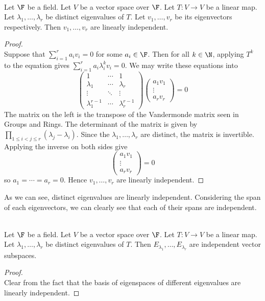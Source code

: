 \documentclass[a4paper]{article}
\begin{document}
\begin{prp}{}{}\\
Let $\F$ be a field. Let $V$ be a vector space over $\F$. Let $T:V\to V$ be a linear map. Let $\lambda_1,\dots,\lambda_r$ be distinct eigenvalues of $T$. Let $v_1,\dots,v_r$ be its eigenvectors respectively. Then $v_1,\dots,v_r$ are linearly independent. 
\begin{proof}\\
Suppose that $\sum_{i=1}^ra_iv_i=0$ for some $a_i\in\F$. Then for all $k\in\N$, applying $T^k$ to the equation gives $\sum_{i=1}^ra_i\lambda_i^kv_i=0$. We may write these equations into $$\begin{pmatrix}
1 & \cdots & 1\\
\lambda_1 & \cdots & \lambda_r\\
\vdots & \ddots & \vdots\\
\lambda_1^{r-1} & \cdots & \lambda_r^{r-1}
\end{pmatrix}\begin{pmatrix}
a_1v_1\\\vdots\\a_rv_r
\end{pmatrix}=0$$ The matrix on the left is the transpose of the Vandermonde matrix seen in Groups and Rings. The determinant of the matrix is given by $\prod_{1\leq i<j\leq r}(\lambda_j-\lambda_i)$. Since the $\lambda_1,\dots,\lambda_r$ are distinct, the matrix is invertible. Applying the inverse on both sides give $$\begin{pmatrix}
a_1v_1\\\vdots\\a_rv_r
\end{pmatrix}=0$$ so $a_1=\cdots=a_r=0$. Hence $v_1,\dots,v_r$ are linearly independent. 
\end{proof}
\end{prp}

As we can see, distinct eigenvalues are linearly independent. Considering the span of each eigenvectors, we can clearly see that each of their spans are independent. 

\begin{prp}{}{}\\
Let $\F$ be a field. Let $V$ be a vector space over $\F$. Let $T:V\to V$ be a linear map. Let $\lambda_1,\dots,\lambda_r$ be distinct eigenvalues of $T$. Then $E_{\lambda_1},\dots,E_{\lambda_r}$ are independent vector subspaces. 
\begin{proof}\\
Clear from the fact that the basis of eigenspaces of different eigenvalues are linearly independent. 
\end{proof}
\end{prp}
\end{document}

